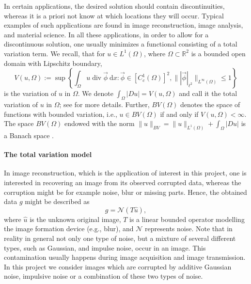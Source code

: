 \documentclass[enabledeprecatedfontcommands,cleardoublepage=empty,headsepline,twoside,11pt,DIV=15,BCOR=12mm,final]{scrartcl}
\newcommand{\N}{{\mathbb N}}
\newcommand{\R}{{\mathbb R}}
\begin{document}
In certain applications, the desired solution should contain discontinuities, whereas it is a priori not know at which locations they will occur. Typical examples of such applications are found in image reconstruction, image analysis, and material science. %
 In all these applications, in order to allow for a discontinuous solution, one usually minimizes a functional consisting of a total variation term. We recall, that for $u\in L^1(\Omega)$, where $\Omega \subset \R^2$ is a bounded open domain with Lipschitz boundary,
$$
V(u,\Omega):=\sup\left\{\int_{\Omega} u \operatorname{div} \vec\phi \ \text{d}x : \vec\phi \in [C_c^1(\Omega)]^2, \|{|\vec\phi|_{\ell^2}}\|_{L^\infty(\Omega)} \leq 1\right\}
$$
is the variation of $u$ in $\Omega$. 
We denote $\int_{\Omega}|Du|=V(u,\Omega)$ and call it the total variation of $u$ in $\Omega$; see \cite{AmFuPa:00, Giusti:84} for more details.
 Further, $BV(\Omega)$ denotes the space of functions with bounded variation, i.e., $u\in BV(\Omega)$ if and only if $V(u,\Omega)<\infty$. The space $BV(\Omega)$ endowed with the norm $\|u\|_{BV} = \|u\|_{L^1(\Omega)} + \int_{\Omega}|Du|$ is a Banach space \cite{Giusti:84}. 

\paragraph{The total variation model}
In image reconstruction, which is the application of interest in this project, one is interested in recovering an image from its observed corrupted data, whereas the corruption might be for example noise, blur or missing parts. 
Hence, the obtained data $g$ might be described as
\begin{equation}\label{eq:g}
g=\mathcal{N}(T\hat{u}),
\end{equation}
where $\hat{u}$ is the unknown original image, $T$ is a linear bounded operator modelling the image formation device (e.g., blur), and $\mathcal{N}$ represents noise. 
Note that in reality in general not only one type of noise, but a mixture of several different types, such as Gaussian, and impulse noise, occur in an image. This contamination usually happens during image acquisition and image transmission. In this project we consider images which are corrupted by additive Gaussian noise, impulsive noise or a combination of these two types of noise.
\end{document}
